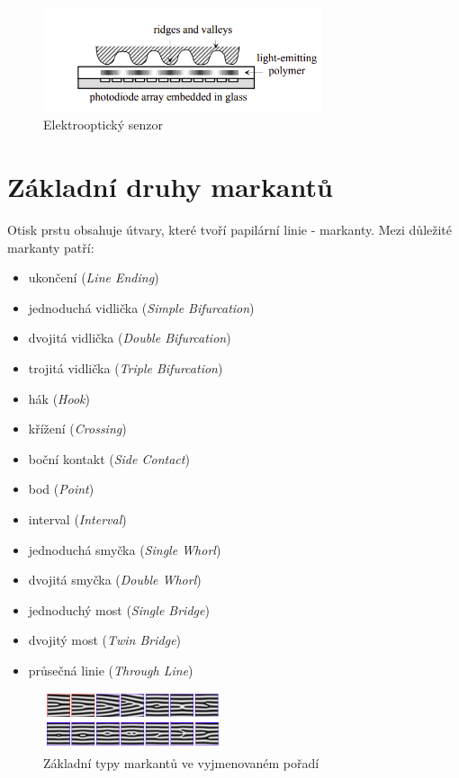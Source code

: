 \begin{itemize}
\begin{figure}[!htbp]
    \centering
    \includegraphics[width=310px]{obrazky-figures/electro.png}
    \caption{Elektrooptický senzor \cite{Maltoni2009}}
\end{figure}

\end{itemize}

\section{Základní druhy markantů}
Otisk prstu obsahuje útvary, které tvoří papilární linie - markanty. Mezi důležité markanty patří: 
\begin{itemize}
    \item ukončení (\textit{Line Ending})
    \item jednoduchá vidlička (\textit{Simple Bifurcation})
    \item dvojitá vidlička (\textit{Double Bifurcation})
    \item trojitá vidlička (\textit{Triple Bifurcation})
    \item hák (\textit{Hook})
    \item křížení (\textit{Crossing})
    \item boční kontakt (\textit{Side Contact})
    \item bod (\textit{Point})
    \item interval (\textit{Interval})
    \item jednoduchá smyčka (\textit{Single Whorl})
    \item dvojitá smyčka (\textit{Double Whorl})
    \item jednoduchý most (\textit{Single Bridge})
    \item dvojitý most (\textit{Twin Bridge})
    \item průsečná linie (\textit{Through Line}) \cite{Drahansky}
\end{itemize}

\begin{figure}[!htbp]
    \centering
    \includegraphics[width=200px]{obrazky-figures/markants.png}
    \caption{Základní typy markantů ve vyjmenovaném pořadí \cite{Drahansky}}
\end{figure}


